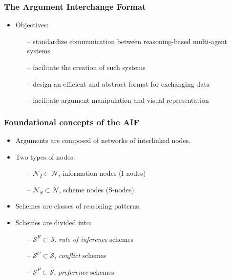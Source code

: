\documentclass{beamer}
\begin{document}
\begin{frame}
\frametitle{The Argument Interchange Format}
\begin{itemize}
\item Objectives: \pause
  \begin{itemize}
  \item[--] standardize communication between reasoning-based multi-agent systems \pause
  \item[--] facilitate the creation of such systems \pause
  \item[--] design an efficient and abstract format for exchanging data \pause
  \item[--] facilitate argument manipulation and visual representation
  \end{itemize}
\end{itemize}
\end{frame}

\begin{frame}
\frametitle{Foundational concepts of the AIF}
\begin{itemize}
\item Arguments are composed of networks of interlinked nodes. \pause
\item Two types of nodes: \pause
  \begin{itemize}
  \item[--] $\mathcal{N}_I \subset \mathcal{N}$, information nodes (I-nodes) \pause
  \item[--] $\mathcal{N}_S \subset \mathcal{N}$, scheme nodes (S-nodes)
  \end{itemize}
\item Schemes are classes of reasoning patterns. \pause
\item Schemes are divided into: \pause
  \begin{itemize}
  \item[--] $\mathcal{S}^R \subset \mathcal{S}$, \emph{rule of inference} schemes \pause
  \item[--] $\mathcal{S}^C \subset \mathcal{S}$, \emph{conflict} schemes \pause
  \item[--] $\mathcal{S}^P \subset \mathcal{S}$, \emph{preference} schemes
  \end{itemize}
\end{itemize}
\end{frame}
\end{document}
